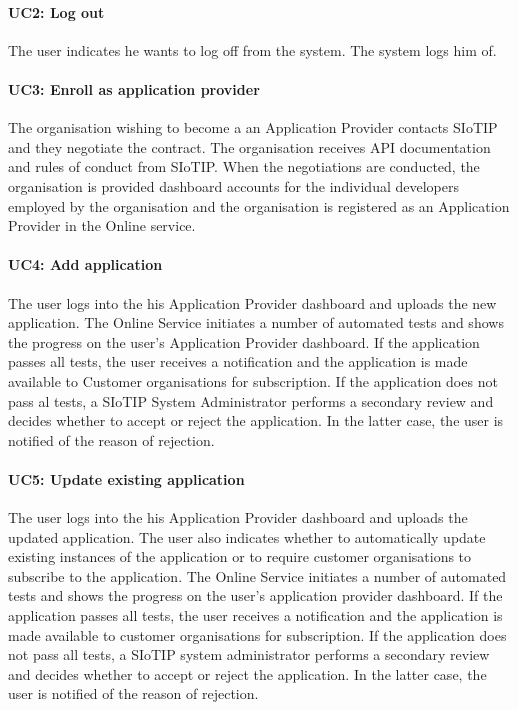 \paragraph{UC2: Log out}
The user indicates he wants to log off from the system.
The system logs him of.

\paragraph{UC3: Enroll as application provider}
The organisation wishing to become a an Application Provider contacts SIoTIP and they negotiate the contract. The organisation receives API documentation and rules of conduct from SIoTIP. When the negotiations are conducted, the organisation is provided dashboard accounts for the individual developers employed by the organisation and the organisation is registered as an Application Provider in the Online service.

\paragraph{UC4: Add application}
The user logs into the his Application Provider dashboard and uploads the new application. The Online Service initiates a number of automated tests and shows the progress on the user's Application Provider dashboard. If the application passes all tests, the user receives a notification and the application is made available to Customer organisations for subscription. If the application does not pass al tests, a SIoTIP System Administrator performs a secondary review and decides whether to accept or reject the application. In the latter case, the user is notified of the reason of rejection.

\paragraph{UC5: Update existing application}
The user logs into the his Application Provider dashboard and uploads the updated application. The user also indicates whether to automatically update existing instances of the application or to require customer organisations to subscribe to the application. The Online Service initiates a number of automated tests and shows the progress on the user's application provider dashboard. If the application passes all tests, the user receives a notification and the application is made available to customer organisations for subscription. If the application does not pass all tests, a SIoTIP system administrator performs a secondary review and decides whether to accept or reject the application. In the latter case, the user is notified of the reason of rejection.

